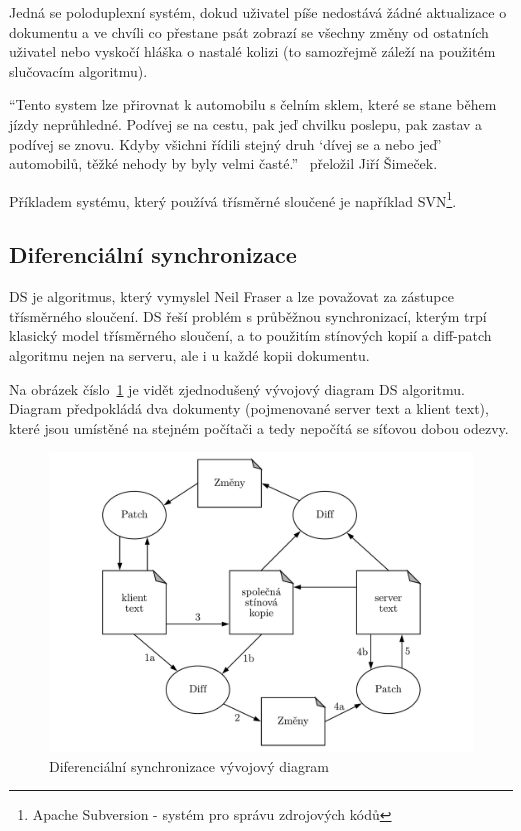 Jedná se poloduplexní systém, dokud uživatel píše nedostává žádné aktualizace o dokumentu a ve chvíli co přestane psát zobrazí se všechny změny od ostatních uživatel nebo vyskočí hláška o nastalé kolizi (to samozřejmě záleží na použitém slučovacím algoritmu).~\cite{ds:neil_paper, ds_neil_video}

\enquote{Tento system lze přirovnat k automobilu s čelním sklem, které se stane během jízdy neprůhledné.
Podívej se na cestu, pak jeď chvilku poslepu, pak zastav a podívej se znovu.
Kdyby všichni řídili stejný druh \enquote{dívej se a nebo jeď} automobilů, těžké nehody by byly velmi časté.}~\cite{ds:neil_paper} přeložil Jiří Šimeček.

Příkladem systému, který používá třísměrné sloučené je například SVN\footnote{Apache Subversion - systém pro správu zdrojových kódů}.

\subsection{Diferenciální synchronizace}\label{subsec:diferencialniSynchronizace}

\gls{DS} je algoritmus, který vymyslel Neil Fraser a lze považovat za zástupce třísměrného sloučení.
\gls{DS} řeší problém s průběžnou synchronizací, kterým trpí klasický model třísměrného sloučení, a to použitím stínových kopií a diff-patch algoritmu nejen na serveru, ale i u každé kopii dokumentu.

Na obrázek číslo~\ref{fig:DS_diagram} je vidět zjednodušený vývojový diagram \gls{DS} algoritmu.
Diagram předpokládá dva dokumenty (pojmenované server text a klient text), které jsou umístěné na stejném počítači a tedy nepočítá se síťovou dobou odezvy.

\begin{figure}[ht]
    \centering
    \includegraphics[width=\textwidth]{partials/analyza/DS_diagram.pdf}
    \caption{Diferenciální synchronizace vývojový diagram~\cite{ds:neil_paper}}\label{fig:DS_diagram}
\end{figure}

